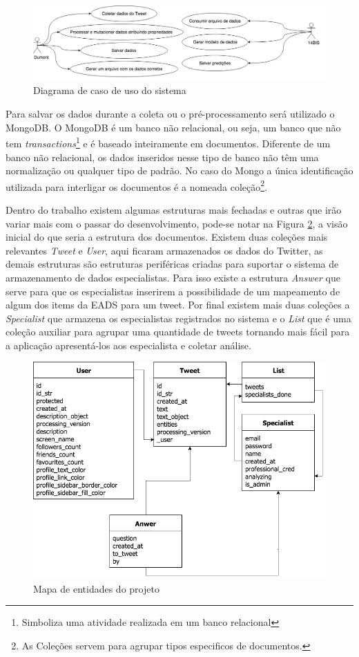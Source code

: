 \begin{figure}[!ht]
    \centering
    \includegraphics[width=.8\textwidth]{imagens/tcc_caso_de_uso.png}
    \caption{Diagrama de caso de uso do sistema}
    \label{fig:tcc_caso_de_uso}
\end{figure}

Para salvar os dados durante a coleta ou o pré-processamento será utilizado o MongoDB. O MongoDB  é um banco não relacional, ou seja, um banco que não tem \textit{transactions}\footnote{Simboliza uma atividade realizada em um banco relacional} e é baseado inteiramente em documentos. Diferente de um banco não relacional, os dados inseridos nesse tipo de banco não têm uma normalização ou qualquer tipo de padrão. No caso do Mongo a única identificação utilizada para interligar os documentos é a nomeada coleção\footnote{As Coleções servem para agrupar tipos especificos de documentos.}.

Dentro do trabalho existem algumas estruturas mais fechadas e outras que irão variar mais com o passar do desenvolvimento, pode-se notar na Figura \ref{fig:entities}, a visão inicial do que seria a estrutura dos documentos. Existem duas coleções mais relevantes \textit{Tweet} e \textit{User}, aqui ficaram armazenados os dados do Twitter, as demais estruturas são estruturas periféricas criadas para suportar o sistema de armazenamento de dados especialistas. Para isso existe a estrutura \textit{Answer} que serve para que os especialistas inserirem a possibilidade de um mapeamento de algum dos items da EADS para um tweet. Por final existem mais duas coleções a \textit{Specialist} que armazena os especialistas registrados no sistema e o \textit{List} que é uma coleção auxiliar para agrupar uma quantidade de tweets tornando mais fácil para a aplicação apresentá-los aos especialista e coletar análise.

\begin{figure}[!h]
    \centering
    \includegraphics[width=.65\textwidth]{imagens/entities.png}
    \caption{Mapa de entidades do projeto}
    \label{fig:entities}
\end{figure}

